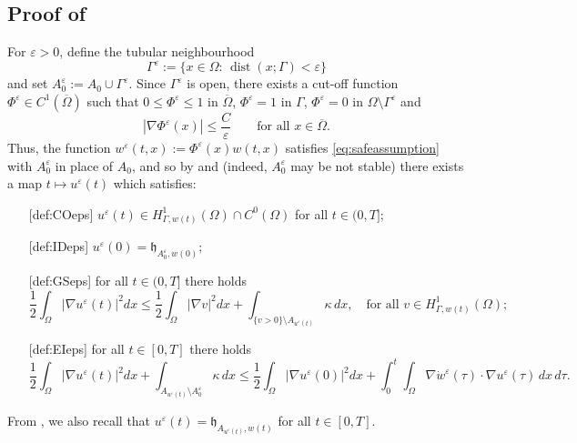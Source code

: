 \documentclass[a4paper,11pt,reqno]{amsart}
\numberwithin{equation}{section}
\theoremstyle{definition}
\theoremstyle{remark}
\begin{document}
\subsection{Proof of }
For $\varepsilon>0$, define the tubular neighbourhood
\begin{equation}
    \Gamma^\varepsilon:=\{x\in \Omega :\, \operatorname{dist}(x;\Gamma)<\varepsilon\}
\end{equation}
and set $A_0^\varepsilon:= A_0\cup \Gamma^\varepsilon$. Since $\Gamma^\varepsilon$ is open, there exists a cut-off function $\Phi^\varepsilon\in C^1(\overline\Omega)$ such that $0\le \Phi^\varepsilon\le 1$ in $\overline{\Omega}$, $\Phi^\varepsilon=1$ in $\Gamma$, $\Phi^\varepsilon=0$ in $\Omega\setminus \Gamma^\varepsilon$ and 
\begin{equation}\label{eq:nablaphi}
    |\nabla \Phi^\varepsilon(x)|\le \frac{C}{\varepsilon}\qquad\text{for all }x\in \overline{\Omega}.
\end{equation}
Thus, the function $w^\varepsilon(t,x):=\Phi^\varepsilon(x) w(t,x)$ satisfies \eqref{eq:safeassumption} with $A_0^\varepsilon$ in place of $A_0$, and so by  and  (indeed, $A_0^\varepsilon$ may be not stable) there exists a map $t\mapsto u^\varepsilon(t)$ which satisfies:
\begin{enumerate}[leftmargin = !, labelwidth=1.2cm, align = left]
        \item [{\crtcrossreflabel{\textup{(CO)}$^\varepsilon$}[def:COeps]}] $u^\varepsilon(t)\in H^1_{\Gamma,w(t)}(\Omega)\cap C^0(\Omega)$ for all $t\in (0,T]$;
        \item[{\crtcrossreflabel{\textup{(ID)}$^\varepsilon$}[def:IDeps]}] $u^\varepsilon(0)=\mathfrak{h}_{A^\varepsilon_0,w(0)}$;
        \item[{\crtcrossreflabel{\textup{(GS)}$^\varepsilon$}[def:GSeps]}] for all $t\in (0,T]$ there holds
        \begin{equation}
            \frac 12 \int_\Omega |\nabla u^\varepsilon(t)|^2 dx\le \frac 12 \int_\Omega |\nabla v|^2 dx+\int_{\{v>0\}\setminus A_{u^\varepsilon(t)}}\kappa\, dx,\quad \text{for all }v\in H^1_{\Gamma,w(t)}(\Omega);
        \end{equation}
        \item[{\crtcrossreflabel{\textup{(EI)}$^\varepsilon$}[def:EIeps]}] for all $t\in [0,T]$ there holds
        \begin{equation}
            \frac 12 \int_\Omega |\nabla u^\varepsilon(t)|^2 dx+\int_{A_{u^\varepsilon(t)}\setminus A^\varepsilon_{0}}\kappa\,d x \le   \frac 12 \int_\Omega |\nabla u^\varepsilon(0)|^2 dx+\int_0^t \int_\Omega \nabla \dot w^\varepsilon(\tau)\cdot \nabla u^\varepsilon(\tau) \, dx\, d\tau.
        \end{equation}
    \end{enumerate}
    From , we also recall that $u^\varepsilon(t)=\mathfrak{h}_{A_{u^\varepsilon(t)},w(t)}$ for all $t\in [0,T]$.
\end{document}
